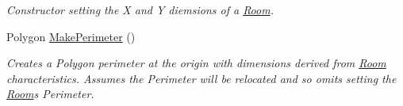 \begin{DoxyCompactItemize}
\begin{DoxyCompactList}\small\item\em Constructor setting the X and Y diemsions of a \mbox{\hyperlink{class_room_kit_1_1_room}{Room}}. \end{DoxyCompactList}\item 
Polygon \mbox{\hyperlink{class_room_kit_1_1_room_abe395580dc9617c4596b18e520111673}{Make\+Perimeter}} ()
\begin{DoxyCompactList}\small\item\em Creates a Polygon perimeter at the origin with dimensions derived from \mbox{\hyperlink{class_room_kit_1_1_room}{Room}} characteristics. Assumes the Perimeter will be relocated and so omits setting the \mbox{\hyperlink{class_room_kit_1_1_room}{Room}}\textquotesingle{}s Perimeter. \end{DoxyCompactList}\end{DoxyCompactItemize}
